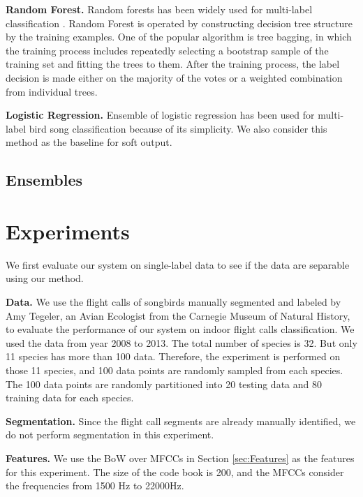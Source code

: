 \documentclass{article} %
\begin{document}

\textbf{Random Forest.} Random forests has been widely used for multi-label classification \cite{Lasseck13, chennovel13, Stowell_NIPSW13, Zhang_SDM2010}.
Random Forest is operated by constructing decision tree structure by the training examples. One of the popular algorithm is tree bagging, in which the training process includes repeatedly selecting a bootstrap sample of the training set and  fitting the trees to them. After the training process, the label decision is made either on the majority of the votes or a weighted combination from individual trees.


\textbf{Logistic Regression.} Ensemble of logistic regression has been used for multi-label bird song classification \cite{Massaron13} because of its simplicity. We also consider this method as the baseline for soft output.

\subsection{Ensembles}



\section{Experiments}

We first evaluate our system on single-label data to see if the data are separable using our method.

\textbf{Data.}  We use the flight calls of songbirds manually segmented and labeled by Amy Tegeler, an Avian Ecologist from the Carnegie Museum of Natural History, to evaluate the performance of our system on indoor flight calls classification. We used the data from year 2008 to 2013. The total number of species is 32. But only 11 species has more than 100 data. Therefore, the experiment is performed on those 11 species, and 100 data points are randomly sampled from each species. The 100 data points are randomly partitioned into 20 testing data and 80 training data for each species.

\textbf{Segmentation.}
Since the flight call segments are already manually identified, we do not perform segmentation in this experiment.

\textbf{Features.}
We use the BoW over MFCCs in Section \ref{sec:Features} as the features for this experiment. The size of the code book is 200, and the MFCCs consider the frequencies from 1500 Hz to 22000Hz.
\end{document}
